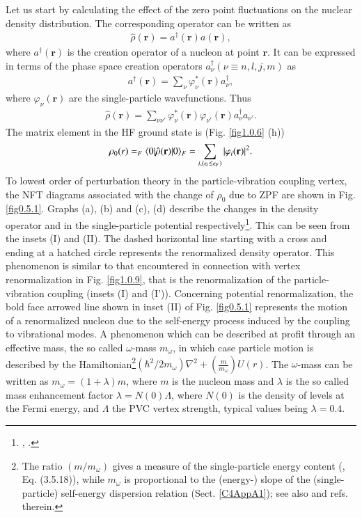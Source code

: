  Let us start by calculating the effect of the zero point fluctuations on the nuclear density distribution. The corresponding operator can be written as
\begin{align}\label{eq0.1.123}
\hat\rho(\mathbf r)=a^\dagger(\mathbf r)a(\mathbf r),
\end{align}
where $a^\dagger(\mathbf r)$ is the creation operator of a nucleon at point $\mathbf r$. It can be expressed in terms of the phase space creation operators $a^\dagger_\nu(\nu\equiv n,l,j,m)$ as
\begin{align}\label{eq0.1.124}
a^\dagger(\mathbf r)=\sum_\nu\varphi^*_\nu(\mathbf r) a^\dagger_\nu,
\end{align}
where $\varphi_\nu(\mathbf r)$ are the single-particle wavefunctions. Thus
\begin{align}\label{eq0.1.125}
\hat\rho(\mathbf r)=\sum_{\nu\nu'}\varphi^*_\nu(\mathbf r)\varphi_{\nu'}(\mathbf r)a^\dagger_\nu a_{\nu'}.
\end{align}
The matrix element in the HF ground state is (Fig. \ref{fig1.0.6} (h))
\begin{align}\label{eq0.1.126}
\rho_0(r)=_F\langle {0|\hat\rho(\mathbf r)|0} \rangle_F=\sum_{i, (\epsilon_i\leq\epsilon_F)}|\varphi_i(\mathbf r)|^2.
\end{align}
To lowest order of perturbation theory in the particle-vibration coupling vertex, the NFT diagrams associated with the change of $\rho_0$ due to ZPF are shown in Fig. \ref{fig0.5.1}. Graphs (a),  (b) and (c), (d) describe the changes in the density operator and in the single-particle potential respectively\footnote{\cite{Barranco:85b}, \cite{Barranco:85}.}. This can be seen from the insets (I) and (II). The dashed horizontal line starting with a cross and ending at a hatched circle represents the renormalized density operator. This phenomenon is similar to that encountered in connection with vertex renormalization in Fig. \ref{fig1.0.9}, that is the renormalization of the particle-vibration coupling (insets (I) and (I')). Concerning potential renormalization, the bold face arrowed line shown in inset (II) of Fig. \ref{fig0.5.1} represents the motion of a renormalized nucleon due to the self-energy process induced by the coupling to vibrational modes. A phenomenon which can be described at profit through an effective mass, the so called $\omega$-mass $m_\omega$, in which case particle motion is described by the Hamiltonian\footnote{The ratio $(m/m_\omega)$ gives a measure of the single-particle energy content (\cite{Mahaux:85}, Eq. (3.5.18)), while $m_\omega$ is proportional to the (energy-) slope of the (single-particle) self-energy dispersion relation (Sect. \ref{C4AppA1}); see also  \cite{Brink:05} and refs. therein.}$\left(\hbar^2/2m_\omega\right)\nabla^2+\left(\frac{m}{m_\omega}\right)U(r)$. The $\omega$-mass can be written as $m_\omega=(1+\lambda)m$, where $m$ is the nucleon mass and $\lambda$ is the so called mass enhancement factor $\lambda=N(0)\Lambda$,  where $N(0)$ is the density of levels at the Fermi energy, and $\Lambda$ the PVC vertex strength, typical values being $\lambda=0.4$.




